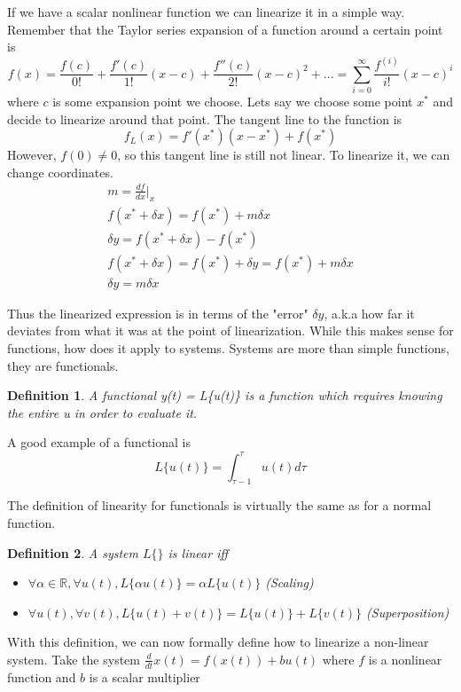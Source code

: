 \documentclass{article}
\newtheorem{definition}{Definition}
\begin{document}
If we have a scalar nonlinear function we can linearize it in a simple way. Remember that the Taylor series expansion of a function around a certain point is
$$ f(x) = \frac{f(c)}{0!}+\frac{f'(c)}{1!}(x-c)+\frac{f''(c)}{2!}(x-c)^2+... = \sum_{i=0}^{\infty}{\frac{f^{(i)}}{i!}(x-c)^i}$$
where $c$ is some expansion point we choose. Lets say we choose some point $x^*$ and decide to linearize around that point.
The tangent line to the function is
$$f_L(x)=f'(x^*)(x-x^*)+f(x^*)$$
However, $f(0)\ne 0$, so this tangent line is still not linear. To linearize it, we can change coordinates.
\[
    \begin{array}{c}
        m = \frac{df}{dx}|_x\\
        f(x^*+\delta x)= f(x^*)+m \delta x\\
        \delta y = f(x^*+\delta x) - f(x^*)\\
        f(x^*+\delta x) = f(x^*)+\delta y = f(x^*)+m \delta x\\
        \delta y = m \delta x
    \end{array}
\]

Thus the linearized expression is in terms of the "error" $\delta y$, a.k.a how far it deviates from what it was at the point of linearization.
While this makes sense for functions, how does it apply to systems. Systems are more than simple functions, they are functionals.
\begin{definition}
    A functional y(t) = L\{u(t)\} is a function which requires knowing the entire u in order to evaluate it.
\end{definition}
A good example of a functional is
$$ L\{u(t)\}=\int_{\tau - 1}^{\tau}{u(t)d\tau}$$

The definition of linearity for functionals is virtually the same as for a normal function.
\begin{definition}
    A system $L\{\}$ is linear iff
    \begin{itemize}
        \item $\forall \alpha\in \mathbb{R}, \forall u(t), L\{\alpha u(t)\} = \alpha L\{u(t)\}$ (Scaling)
        \item $\forall u(t), \forall v(t), L\{u(t) + v(t)\} = L\{u(t)\}+L\{v(t)\}$ (Superposition)
    \end{itemize}
\end{definition}
With this definition, we can now formally define how to linearize a non-linear system.
Take the system $\frac{d}{dt}x(t) = f(x(t))+bu(t)$ where $f$ is a nonlinear function and $b$ is a scalar multiplier
\end{document}
